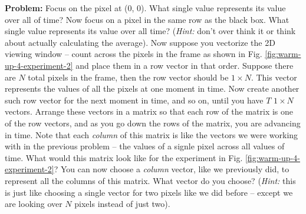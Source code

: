 \textbf{Problem:} Focus on the pixel at (0, 0). What single value represents its value over all of time? Now focus on a pixel in the same row as the black box. What single value represents its value over all time? (\textit{Hint:} don't over think it or think about actually calculating the average). Now suppose you vectorize the 2D viewing window -- count across the pixels in the frame as shown in Fig. \ref{fig:warm-up-4-experiment-2} and place them in a row vector in that order. Suppose there are $N$ total pixels in the frame, then the row vector should be $1 \times N$. This vector represents the values of all the pixels at one moment in time. Now create another such row vector for the next moment in time, and so on, until you have $T$ $1 \times N$ vectors. Arrange these vectors in a matrix so that each row of the matrix is one of the row vectors, and as you go down the rows of the matrix, you are advancing in time. Note that each \textit{column} of this matrix is like the vectors we were working with in the previous problem -- the values of a signle pixel across all values of time. What would this matrix look like for the experiment in Fig. \ref{fig:warm-up-4-experiment-2}? You can now choose a \textit{column} vector, like we previously did, to represent all the columns of this matrix. What vector do you choose? (\textit{Hint:} this is just like choosing a single vector for two pixels like we did before -- except we are looking over $N$ pixels instead of just two).